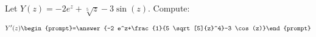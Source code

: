 \documentclass{ximera}
\author{Bart Snapp}
\begin{document}
\begin{exercise}

Let $Y(z) = -2 e^z+\sqrt[5]{z}-3 \sin (z)$. Compute:

\[
Y'(z)
\begin{prompt}=\answer{-2 e^z+\frac{1}{5 \sqrt[5]{z}^4}-3 \cos (z)}\end{prompt}
\]
\end{exercise}
\end{document}
